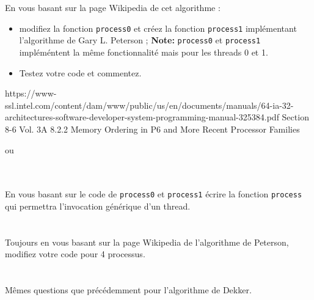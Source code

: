 \documentclass{exam}
\begin{document}
\begin{questions}
\begin{parts}
  \part{} En vous basant sur la page Wikipedia de cet algorithme :
\begin{itemize}
  \item modifiez la fonction \texttt{process0} et créez la fonction \texttt{process1} implémentant l'algorithme de Gary L. Peterson ;
  \textbf{Note:}  \texttt{process0}  et  \texttt{process1} impléméntent la même fonctionnalité mais pour les threads 0 et 1.
  \item Testez votre code et commentez.
 \end{itemize}
  \begin{solution}
    https://www-ssl.intel.com/content/dam/www/public/us/en/documents/manuals/64-ia-32-architectures-software-developer-system-programming-manual-325384.pdf Section 8-6 Vol. 3A 8.2.2 Memory Ordering in P6 and More Recent Processor Families

    ou
    \inputminted{C}{correc/peterson/peterson.c}
  \end{solution}
  \part{} En vous basant sur le code de \texttt{process0} et \texttt{process1} écrire la fonction \texttt{process} qui permettra l'invocation générique d'un thread.
\part{} Toujours en vous basant sur la page Wikipedia de l'algorithme de Peterson, modifiez votre code pour 4 processus.
\part{} Mêmes questions que précédemment pour l'algorithme de Dekker.
\end{parts}
\end{questions}
\end{document}
